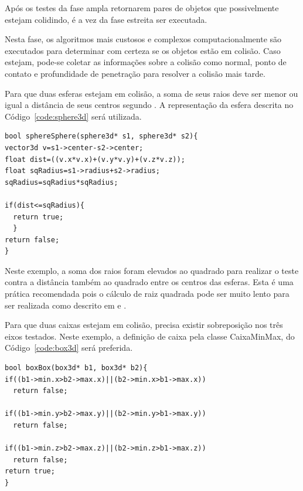 Após  os testes da fase ampla retornarem pares de objetos que possivelmente
estejam colidindo, é a vez da fase estreita ser executada.

Nesta fase, os algoritmos mais custosos e complexos computacionalmente são
executados para determinar com certeza se os objetos estão em colisão.
Caso estejam, pode-se coletar as informações sobre a colisão como normal, ponto
de contato e profundidade de penetração para resolver a colisão mais tarde.


Para que duas esferas estejam em colisão, a soma de seus raios deve ser menor
ou igual a distância de seus centros segundo .
A representação da esfera descrita no Código~\ref{code:sphere3d} será utilizada.

\begin{lstlisting}[frame=single,caption=Colisão entre esferas\label{code:collisionSphereSphere}]
bool sphereSphere(sphere3d* s1, sphere3d* s2){
vector3d v=s1->center-s2->center;
float dist=((v.x*v.x)+(v.y*v.y)+(v.z*v.z));
float sqRadius=s1->radius+s2->radius;
sqRadius=sqRadius*sqRadius;

if(dist<=sqRadius){
  return true;
  }
return false;
}
\end{lstlisting}

Neste exemplo, a soma dos raios foram elevados ao quadrado para realizar o
teste contra a distância também ao quadrado entre os centros das esferas.
Esta é uma prática recomendada pois o cálculo de raiz quadrada pode ser muito
lento para ser realizada como descrito em  e .


Para que duas caixas estejam em colisão, precisa existir sobreposição nos três
eixos testados.
Neste exemplo, a definição de caixa pela classe CaixaMinMax, do Código~\ref{code:box3d} será preferida.

\begin{lstlisting}[frame=single,caption=Colisão entre caixas\label{code:collisionBoxBox}]
bool boxBox(box3d* b1, box3d* b2){
if((b1->min.x>b2->max.x)||(b2->min.x>b1->max.x))
  return false;

if((b1->min.y>b2->max.y)||(b2->min.y>b1->max.y))
  return false;

if((b1->min.z>b2->max.z)||(b2->min.z>b1->max.z))
  return false;
return true;
}
\end{lstlisting}

